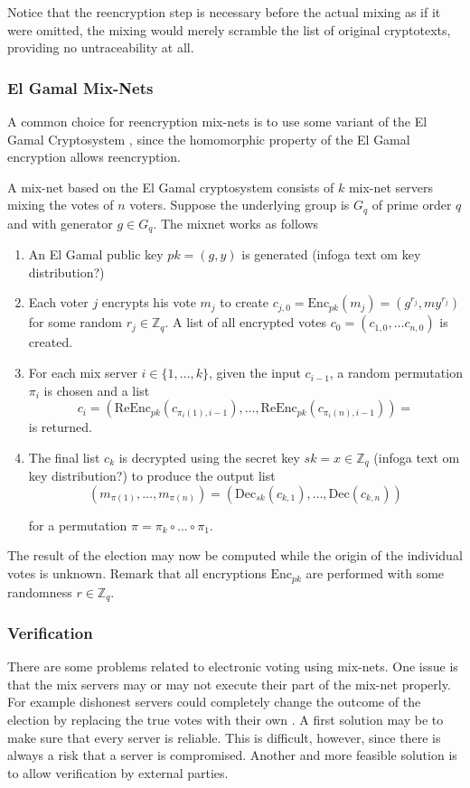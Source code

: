 Notice that the reencryption step is necessary before the actual
mixing as if it were omitted, the mixing would merely scramble the
list of original cryptotexts, providing no untraceability at all.

\subsubsection{El Gamal Mix-Nets}

A common choice for reencryption mix-nets is to use some variant of
the El Gamal Cryptosystem \cite{electronicvoting}, since the
homomorphic property of the El Gamal encryption allows reencryption.

A mix-net based on the El Gamal cryptosystem consists of $k$ mix-net
servers mixing the votes of $n$ voters. Suppose the underlying group
is $G_q$ of prime order $q$ and with generator $g \in G_q$. The mixnet
works as follows \cite{electronicvoting2}\\

\begin{enumerate}
\item An El Gamal public key $pk = (g,y)$ is generated (infoga text om key distribution?)
\item Each voter $j$ encrypts his vote $m_j$ to create $c_{j,0} =
  \mathrm{Enc}_{pk}(m_j) = (g^{r_j},my^{r_j})$ for some random $r_j
  \in \mathbb{Z}_q$.  A list of all encrypted votes $c_0 = \left(
  c_{1,0}, \hdots c_{n,0}\right)$ is created.
\item For each mix server $i \in \{1,\hdots, k\}$, given the input
  $c_{i-1}$, a random permutation $\pi _i$ is chosen and a list 
  $$ 
  c_i =\left(\mathrm{ReEnc}_{pk}(c_{\pi_i(1),i-1}), \hdots,
  \mathrm{ReEnc}_{pk}(c_{\pi_i(n), i-1})\right) =
  $$
  is returned.
\item The final list $c_k$ is decrypted using the secret key $sk = x
  \in \mathbb{Z}_q$ (infoga text om key distribution?) to produce
  the output list
 $$ 
  (m_{\pi (1)}, \hdots , m_{\pi (n)}) =
  \left(\mathrm{Dec}_{sk}(c_{k,1}), \hdots, \mathrm{Dec}(c_{k,n})\right)
  $$
  
  for a permutation $\pi = \pi_k \circ \hdots \circ \pi_1$.
\end{enumerate}

 The result of the election may now be computed while the origin of
 the individual votes is unknown. Remark that all encryptions
 $\mathrm{Enc}_{pk}$ are performed with some randomness $r \in
 \mathbb{Z}_q$.

\subsubsection{Verification}
There are some problems related to electronic voting using
mix-nets. One issue is that the mix servers may or may not execute
their part of the mix-net properly. For example dishonest servers
could completely change the outcome of the election by replacing the
true votes with their own \cite{electronicvoting}. A first solution
may be to make sure that every server is reliable. This is difficult,
however, since there is always a risk that a server is
compromised. Another and more feasible solution is to allow
verification by external parties.


